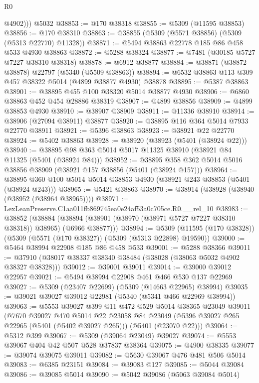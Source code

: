 \begin{lexlean}{R0}
\begin{coremodule}
          @4902)))
    @5032
@38853 := @170 @38318
@38855 := @5309 (@11595 @38853)
@38856 := @170 @38310
@38863 := @38855 (@5309 (@5571 @38856) (@5309 (@5313 @22770) @11328))
@38871 := @5494 @38863 @22778 @185 @86 @458 @533 @4930 @38863
@38872 := @5288 @38324
@38877 := @7481 (@30185 @5727 @7227 @38310 @38318)
@38878 := @6912 @38877
@38884 := @38871 (@38872 @38878) @22797 (@5340 (@5509 @38863))
@38894 := @6532 @38863 @113 @309 @457 @38322 @5014 (@4899 @38877 @4930) @38878
@38895 := @5387 @38863
@38901 := @38895 @455 @100 @38320 @5014 @38877 @4930
@38906 := @6860 @38863 @452 @454 @28886 @38319
@38907 := @4899 @38856
@38909 := @4899 @38853 @4930
@38910 := @38907 @38909
@38911 := @11336 @38910
@38914 := @38906 (@27094 @38911) @38877
@38920 := @38895 @116 @364 @5014 @7933 @22770 @38911
@38921 := @5396 @38863
@38923 := @38921 @22 @22770
@38924 := @5402 @38863
@38928 := @38920 (@38923 (@5401 (@38924 @22)))
@38940 := @38895 @98 @363 @5014 @5017 @11325 @38910 (@38921 @84 @11325 (@5401 (@38924 @84)))
@38952 := @38895 @358 @362 @5014 @5016 @38856 @38909 (@38921 @157 @38856 (@5401 (@38924 @157)))
@38964 := @38895 @360 @100 @5014 @5014 @38853 @4930 (@38921 @243 @38853 (@5401 (@38924 @243)))
@38965 := @5421 @38863
@38970 := @38914 (@38928 (@38940 (@38952 (@38964 @38965))))
@38971 := LexLeanPreserve.C1aa011fb869745ea0e24af53a0c705ce.R0.__rel_10
@38983 := @38852
    (@38884 (@38894 (@38901 (@38970 (@38971 @5727 @7227 @38310 @38318)) @38965) (@6966 @38877)))
@38994 := @5309 (@11595 (@170 @38328)) (@5309 (@5571 (@170 @38327)) (@5309 (@5313 @22898) @19590))
@39000 := @5464 @38994 @22908 @185 @86 @458 @533
@39001 := @5288 @38366
@39011 := @37910 (@38017 @38337 @38340 @38484 (@38028 (@38063 @5032 @4902 @38327 @38328)))
@39012 := @39001 @39011
@39014 := @39000 @39012 @22957
@39021 := @5494 @38994 @22908 @461 @466 @530 @137 @22969
@39027 := @5309 (@23407 @22699) (@5309 (@14663 @22965) @38994)
@39035 := @39021 @39027 @39012 @22981 (@5340 (@5341 @466 @22969 @38994))
@39063 := @5553
    @39027
    @399
    @11
    @472
    @529
    @5014
    @38365
    @23049
    @39011
    (@7670
      @39027
      @470
      @5014
      @22
      @23058
      @84
      @23049
      (@5396 @39027 @265 @22965 (@5401 (@5402 @39027 @265)))
      (@5401 (@23070 @22)))
@39064 := @5312 @399
@39067 := @5309 (@39064 @23049) @39027
@39074 := @5553 @39067 @404 @42 @507 @528 @37837 @38364
@39075 := @4900 @38335
@39077 := @39074 @39075 @39011
@39082 := @5630 @39067 @476 @481 @506 @5014
@39083 := @6385 @23151
@39084 := @39083 @127
@39085 := @5044 @39084
@39086 := @39085 @5014
@39090 := @5042 @39086 (@5063 @39084 @5014)

\end{coremodule}
\end{lexlean}
